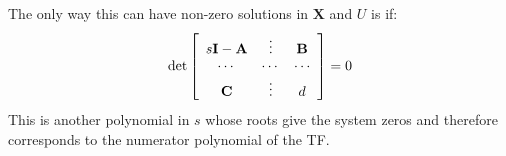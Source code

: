 The only way this can have non-zero solutions in  $\mathbf{X}$  and  $U$  is if:
\[
\det \left[ {\begin{array}{*{20}c}
   {s{\bf{I}} - {\bf{A}}} &  \vdots  & {\bf{B}}  \\
    \cdots  &  \cdots  &  \cdots   \\
   {\bf{C}} &  \vdots  & d  \\
\end{array}} \right] = 0
\]
This is another polynomial in $s$ whose roots give the system zeros and therefore corresponds to the numerator polynomial of the TF.

\endinput
